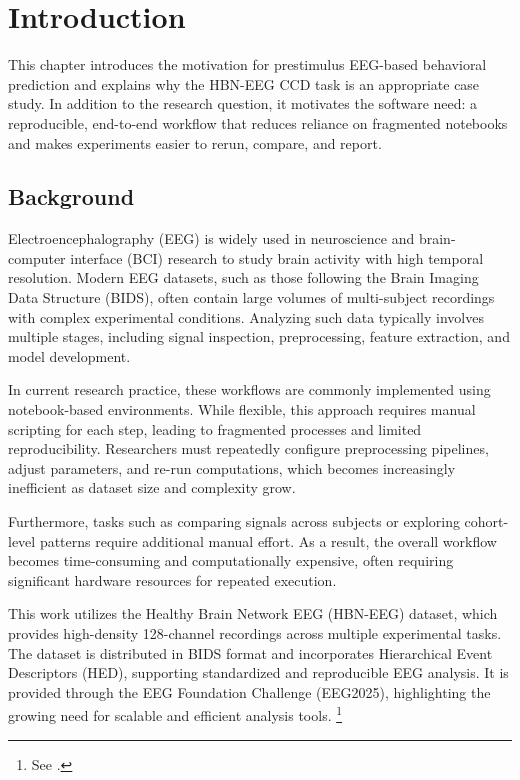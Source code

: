 \chapter{Introduction}
\label{ch:introduction}

\noindent
This chapter introduces the motivation for prestimulus EEG-based behavioral prediction and explains why the HBN-EEG CCD task is an appropriate case study. In addition to the research question, it motivates the software need: a reproducible, end-to-end workflow that reduces reliance on fragmented notebooks and makes experiments easier to rerun, compare, and report.
\vspace{1em}

\section{Background}
\label{sec:background}

Electroencephalography (EEG) is widely used in neuroscience and brain-computer interface (BCI) research to study brain activity with high temporal resolution. Modern EEG datasets, such as those following the Brain Imaging Data Structure (BIDS), often contain large volumes of multi-subject recordings with complex experimental conditions. Analyzing such data typically involves multiple stages, including signal inspection, preprocessing, feature extraction, and model development.
\vspace{0.5em}

In current research practice, these workflows are commonly implemented using notebook-based environments. While flexible, this approach requires manual scripting for each step, leading to fragmented processes and limited reproducibility. Researchers must repeatedly configure preprocessing pipelines, adjust parameters, and re-run computations, which becomes increasingly inefficient as dataset size and complexity grow.
\vspace{0.5em}

Furthermore, tasks such as comparing signals across subjects or exploring cohort-level patterns require additional manual effort. As a result, the overall workflow becomes time-consuming and computationally expensive, often requiring significant hardware resources for repeated execution.
\vspace{0.5em}

This work utilizes the Healthy Brain Network EEG (HBN-EEG) dataset, which provides high-density 128-channel recordings across multiple experimental tasks. The dataset is distributed in BIDS format and incorporates Hierarchical Event Descriptors (HED), supporting standardized and reproducible EEG analysis. It is provided through the EEG Foundation Challenge (EEG2025), highlighting the growing need for scalable and efficient analysis tools. \footnote{See \cite{eeg_foundation_challenge_2025,hbn_fair_2024}.}

